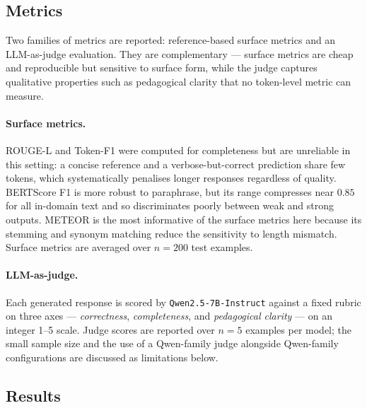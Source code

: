 \subsection{Metrics}

Two families of metrics are reported: reference-based surface metrics and an LLM-as-judge
evaluation. They are complementary --- surface metrics are cheap and reproducible but
sensitive to surface form, while the judge captures qualitative properties such as
pedagogical clarity that no token-level metric can measure.

\paragraph{Surface metrics.}
ROUGE-L and Token-F1 were computed for completeness but are unreliable in this setting:
a concise reference and a verbose-but-correct prediction share few tokens, which
systematically penalises longer responses regardless of quality. BERTScore F1 is more
robust to paraphrase, but its range compresses near $0.85$ for all in-domain text and so
discriminates poorly between weak and strong outputs. METEOR is the most informative of
the surface metrics here because its stemming and synonym matching reduce the sensitivity
to length mismatch. Surface metrics are averaged over $n=200$ test examples.

\paragraph{LLM-as-judge.}
Each generated response is scored by \texttt{Qwen2.5-7B-Instruct} against a fixed rubric
on three axes --- \emph{correctness}, \emph{completeness}, and \emph{pedagogical
clarity} --- on an integer 1--5 scale. Judge scores are reported over $n=5$ examples per model;
the small sample size and the use of a Qwen-family judge alongside Qwen-family
configurations are discussed as limitations below.

\subsection{Results}

